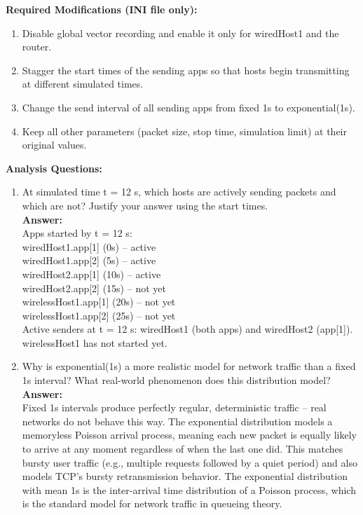 \documentclass[12pt]{article}
\begin{document}
\textbf{Required Modifications (INI file only):}
\begin{enumerate}
    \item Disable global vector recording and enable it only for wiredHost1 and the router.
    \item Stagger the start times of the sending apps so that hosts begin transmitting at different simulated times.
    \item Change the send interval of all sending apps from fixed 1s to exponential(1s).
    \item Keep all other parameters (packet size, stop time, simulation limit) at their original values.
\end{enumerate}

\textbf{Analysis Questions:}
\begin{enumerate}
    \item At simulated time t = 12 s, which hosts are actively sending packets and which are not? Justify your answer using the start times.\\
    \textbf{Answer:}\\
    Apps started by t = 12 s:\\
    wiredHost1.app[1] (0s) -- active\\
    wiredHost1.app[2] (5s) -- active\\
    wiredHost2.app[1] (10s) -- active\\
    wiredHost2.app[2] (15s) -- not yet\\
    wirelessHost1.app[1] (20s) -- not yet\\
    wirelessHost1.app[2] (25s) -- not yet\\
    Active senders at t = 12 s: wiredHost1 (both apps) and wiredHost2 (app[1]). wirelessHost1 has not started yet.
    \item Why is exponential(1s) a more realistic model for network traffic than a fixed 1s interval? What real-world phenomenon does this distribution model?\\
    \textbf{Answer:}\\
    Fixed 1s intervals produce perfectly regular, deterministic traffic -- real networks do not behave this way. The exponential distribution models a memoryless Poisson arrival process, meaning each new packet is equally likely to arrive at any moment regardless of when the last one did. This matches bursty user traffic (e.g., multiple requests followed by a quiet period) and also models TCP's bursty retransmission behavior. The exponential distribution with mean 1s is the inter-arrival time distribution of a Poisson process, which is the standard model for network traffic in queueing theory.

\end{enumerate}
\end{document}
